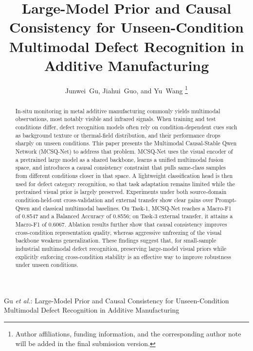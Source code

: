 \documentclass[journal]{IEEEtran}
\begin{document}
\title{Large-Model Prior and Causal Consistency for Unseen-Condition Multimodal Defect Recognition in Additive Manufacturing}

\author{Junwei~Gu, Jiahui~Guo, and Yu~Wang%
\thanks{Author affiliations, funding information, and the corresponding author note will be added in the final submission version.}}

%
{Gu \MakeLowercase{\textit{et al.}}: Large-Model Prior and Causal Consistency for Unseen-Condition Multimodal Defect Recognition in Additive Manufacturing}

\maketitle

\begin{abstract}
In-situ monitoring in metal additive manufacturing commonly yields multimodal observations, most notably visible and infrared signals. When training and test conditions differ, defect recognition models often rely on condition-dependent cues such as background texture or thermal-field distribution, and their performance drops sharply on unseen conditions. This paper presents the Multimodal Causal-Stable Qwen Network (MCSQ-Net) to address that problem. MCSQ-Net uses the visual encoder of a pretrained large model as a shared backbone, learns a unified multimodal fusion space, and introduces a causal consistency constraint that pulls same-class samples from different conditions closer in that space. A lightweight classification head is then used for defect category recognition, so that task adaptation remains limited while the pretrained visual prior is largely preserved. Experiments under both source-domain condition-held-out cross-validation and external transfer show clear gains over Prompt-Qwen and classical multimodal baselines. On Task-1, MCSQ-Net reaches a Macro-F1 of 0.8547 and a Balanced Accuracy of 0.8556; on Task-3 external transfer, it attains a Macro-F1 of 0.6067. Ablation results further show that causal consistency improves cross-condition representation quality, whereas aggressive unfreezing of the visual backbone weakens generalization. These findings suggest that, for small-sample industrial multimodal defect recognition, preserving large-model visual priors while explicitly enforcing cross-condition stability is an effective way to improve robustness under unseen conditions.
\end{abstract}
\end{document}
